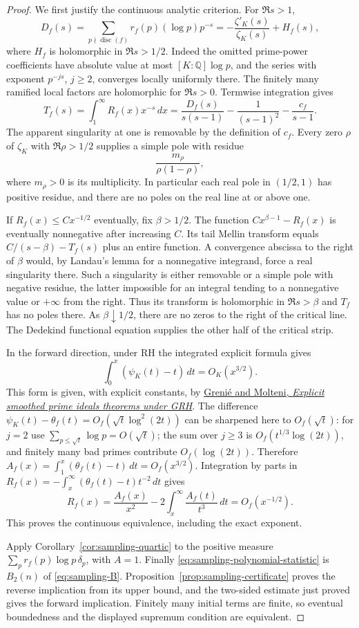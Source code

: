 \begin{proof}
We first justify the continuous analytic criterion. For $\Re s>1$,
\[
 D_f(s)=\sum_{p\nmid\operatorname{disc}(f)}r_f(p)(\log p)p^{-s}
       =-\frac{\zeta'_K(s)}{\zeta_K(s)}+H_f(s),
\]
where $H_f$ is holomorphic in $\Re s>1/2$. Indeed the omitted
prime-power coefficients have absolute value at most
$[K:\mathbb Q]\log p$, and the series with exponent $p^{-js}$,
$j\ge2$, converges locally uniformly there. The finitely many
ramified local factors are holomorphic for $\Re s>0$.
Termwise integration gives
\[
 T_f(s)=\int_1^\infty R_f(x)x^{-s}\,dx
       =\frac{D_f(s)}{s(s-1)}-\frac1{(s-1)^2}-\frac{c_f}{s-1}.
\]
The apparent singularity at one is removable by the definition of
$c_f$. Every zero $\rho$ of $\zeta_K$ with $\Re\rho>1/2$ supplies
a simple pole with residue
\[
 \frac{m_\rho}{\rho(1-\rho)},
\]
where $m_\rho>0$ is its multiplicity. In particular each real pole
in $(1/2,1)$ has positive residue, and there are no poles on the real
line at or above one.

If $R_f(x)\le Cx^{-1/2}$ eventually, fix $\beta>1/2$. The function
$Cx^{\beta-1}-R_f(x)$ is eventually nonnegative after increasing $C$.
Its tail Mellin transform equals $C/(s-\beta)-T_f(s)$ plus an entire
function. A convergence abscissa to the right of $\beta$ would, by
Landau's lemma for a nonnegative integrand, force a real singularity
there. Such a singularity is either removable or a simple pole with
negative residue, the latter impossible for an integral tending to
a nonnegative value or $+\infty$ from the right. Thus its transform
is holomorphic in $\Re s>\beta$ and $T_f$ has no poles there.
As $\beta\downarrow1/2$, there are no zeros to the right of the
critical line. The Dedekind functional equation supplies the other
half of the critical strip.

In the forward direction, under RH the integrated explicit formula
gives
\[
 \int_0^x(\psi_K(t)-t)\,dt=O_K(x^{3/2}).
\]
This form is given, with explicit constants, by
\href{https://arxiv.org/abs/1312.4465}{Greni\'e and Molteni,
\emph{Explicit smoothed prime ideals theorems under GRH}}.
The difference $\psi_K(t)-\theta_f(t)=O_f(\sqrt t\log^2(2t))$
can be sharpened here to $O_f(\sqrt t)$: for $j=2$ use
$\sum_{p\le\sqrt t}\log p=O(\sqrt t)$; the sum over $j\ge3$
is $O_f(t^{1/3}\log(2t))$, and finitely many bad primes contribute
$O_f(\log(2t))$. Therefore
$A_f(x)=\int_1^x(\theta_f(t)-t)\,dt=O_f(x^{3/2})$.
Integration by parts in
$R_f(x)=-\int_x^\infty(\theta_f(t)-t)t^{-2}\,dt$ gives
\[
 R_f(x)=\frac{A_f(x)}{x^2}-2\int_x^\infty\frac{A_f(t)}{t^3}\,dt
       =O_f(x^{-1/2}).
\]
This proves the continuous equivalence, including the exact exponent.

Apply Corollary~\ref{cor:sampling-quartic} to the positive measure
$\sum_p r_f(p)\log p\,\delta_p$, with $A=1$.
Finally \eqref{eq:sampling-polynomial-statistic} is $B_2(n)$ of
\eqref{eq:sampling-B}. Proposition~\ref{prop:sampling-certificate}
proves the reverse implication from its upper bound, and the
two-sided estimate just proved gives the forward implication.
Finitely many initial terms are finite, so eventual boundedness and
the displayed supremum condition are equivalent.
\end{proof}

